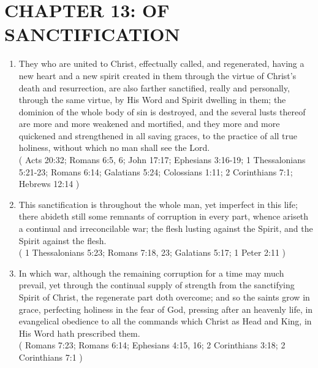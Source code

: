 \documentclass[12pt,a4paper]{book}
\begin{document}
\chapter{CHAPTER 13: OF SANCTIFICATION}
\label{ch-sanc}
\begin{enumerate}
\item They who are united to Christ, effectually called, and regenerated, having a new heart and a new spirit created in them through the virtue of Christ's death and resurrection, are also farther sanctified, really and personally, through the same virtue, by His Word and Spirit dwelling in them; the dominion of the whole body of sin is destroyed, and the several lusts thereof are more and more weakened and mortified, and they more and more quickened and strengthened in all saving graces, to the practice of all true holiness, without which no man shall see the Lord.\\
( Acts 20:32; Romans 6:5, 6; John 17:17; Ephesians 3:16-19; 1 Thessalonians 5:21-23; Romans 6:14; Galatians 5:24; Colossians 1:11; 2 Corinthians 7:1; Hebrews 12:14 )
\item This sanctification is throughout the whole man, yet imperfect in this life; there abideth still some remnants of corruption in every part, whence ariseth a continual and irreconcilable war; the flesh lusting against the Spirit, and the Spirit against the flesh.\\
( 1 Thessalonians 5:23; Romans 7:18, 23; Galatians 5:17; 1 Peter 2:11 )
\item In which war, although the remaining corruption for a time may much prevail, yet through the continual supply of strength from the sanctifying Spirit of Christ, the regenerate part doth overcome; and so the saints grow in grace, perfecting holiness in the fear of God, pressing after an heavenly life, in evangelical obedience to all the commands which Christ as Head and King, in His Word hath prescribed them.\\
( Romans 7:23; Romans 6:14; Ephesians 4:15, 16; 2 Corinthians 3:18; 2 Corinthians 7:1 )
\end{enumerate}
\end{document}
